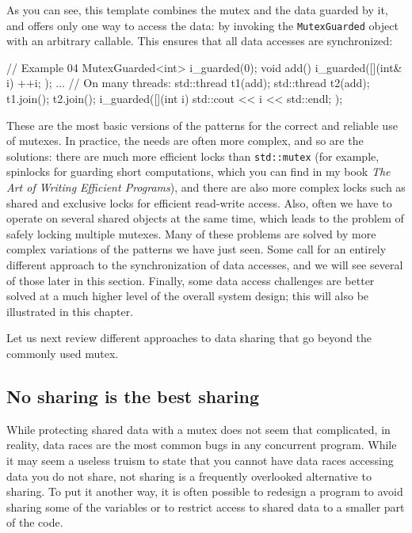 As you can see, this template combines the mutex and the data guarded by it, and offers only one way to access the data: by invoking the \texttt{MutexGuarded} object with an arbitrary callable. This ensures that all data accesses are synchronized:

\begin{code}
// Example 04
MutexGuarded<int> i_guarded(0);
void add() {
  i_guarded([](int& i) { ++i; });
}
...
// On many threads:
std::thread t1(add);
std::thread t2(add);
t1.join();
t2.join();
i_guarded([](int i) { std::cout << i << std::endl; });
\end{code}

These are the most basic versions of the patterns for the correct and reliable use of mutexes. In practice, the needs are often more complex, and so are the solutions: there are much more efficient locks than \texttt{std::mutex} (for example, spinlocks for guarding short computations, which you can find in my book \emph{The Art of Writing Efficient Programs}), and there are also more complex locks such as shared and exclusive locks for efficient read-write access. Also, often we have to operate on several shared objects at the same time, which leads to the problem of safely locking multiple mutexes. Many of these problems are solved by more complex variations of the patterns we have just seen. Some call for an entirely different approach to the synchronization of data accesses, and we will see several of those later in this section. Finally, some data access challenges are better solved at a much higher level of the overall system design; this will also be illustrated in this chapter.

Let us next review different approaches to data sharing that go beyond the commonly used mutex.

\subsection{No sharing is the best sharing}

While protecting shared data with a mutex does not seem that complicated, in reality, data races are the most common bugs in any concurrent program. While it may seem a useless truism to state that you cannot have data races accessing data you do not share, not sharing is a frequently overlooked alternative to sharing. To put it another way, it is often possible to redesign a program to avoid sharing some of the variables or to restrict access to shared data to a smaller part of the code.

